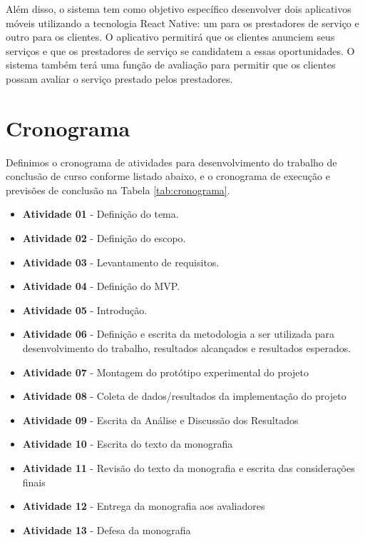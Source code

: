 Além disso, o sistema tem como objetivo específico desenvolver dois aplicativos móveis utilizando a tecnologia React Native: um para os prestadores de serviço e outro para os clientes. O aplicativo permitirá que os clientes anunciem seus serviços e que os prestadores de serviço se candidatem a essas oportunidades. O sistema também terá uma função de avaliação para permitir que os clientes possam avaliar o serviço prestado pelos prestadores.

\section{Cronograma}


Definimos o cronograma de atividades para desenvolvimento do trabalho de conclusão de curso conforme listado abaixo, e o cronograma de execução e previsões de conclusão na Tabela \ref{tab:cronograma}.

\begin{itemize}
    \item \textbf{Atividade 01} - Definição do tema.
    
    \item \textbf{Atividade 02} - Definição do escopo.
   
    \item \textbf{Atividade 03} - Levantamento de requisitos.
    
    \item \textbf{Atividade 04} - Definição do MVP.
    
    \item \textbf{Atividade 05} - Introdução.
    
    \item \textbf{Atividade 06} - Definição e escrita da metodologia a ser utilizada para desenvolvimento do trabalho, resultados alcançados e  resultados esperados.
    
    \item \textbf{Atividade 07} - Montagem do protótipo experimental do projeto
    
    \item \textbf{Atividade 08} - Coleta de dados/resultados da implementação do projeto
    
    \item \textbf{Atividade 09} - Escrita da Análise e Discussão dos Resultados
    
    \item \textbf{Atividade 10} - Escrita do texto da monografia
    
    \item \textbf{Atividade 11} - Revisão do texto da monografia e escrita das considerações finais
    
    \item \textbf{Atividade 12} - Entrega da monografia aos avaliadores
    
    \item \textbf{Atividade 13} - Defesa da monografia
    
\end{itemize}

